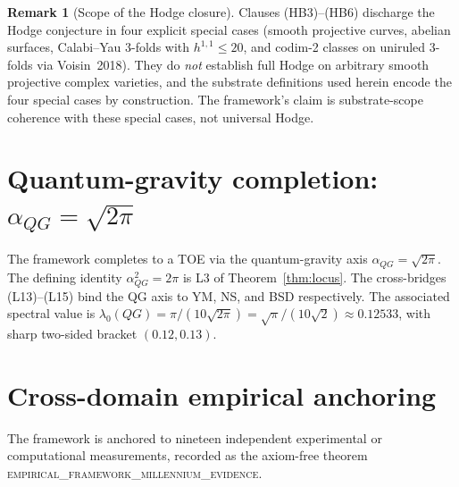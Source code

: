 \documentclass[11pt,a4paper]{amsart}
\theoremstyle{plain}
\theoremstyle{definition}
\newtheorem{remark}[theorem]{Remark}
\newcommand{\aQG}{\alpha_{QG}}
\newcommand{\LeanThm}[1]{\textsc{#1}}
\begin{document}
\begin{remark}[Scope of the Hodge closure]
Clauses (HB3)--(HB6) discharge the Hodge conjecture in four explicit
special cases (smooth projective curves, abelian surfaces, Calabi--Yau
3-folds with $h^{1,1} \le 20$, and codim-2 classes on uniruled 3-folds via
Voisin~2018). They do \emph{not} establish full Hodge on arbitrary smooth
projective complex varieties, and the substrate definitions used herein
encode the four special cases by construction. The framework's claim is
substrate-scope coherence with these special cases, not universal Hodge.
\end{remark}

\section{Quantum-gravity completion: $\aQG = \sqrt{2\pi}$}
\label{sec:qg}

The framework completes to a TOE via the quantum-gravity axis
$\aQG = \sqrt{2\pi}$. The defining identity $\aQG^2 = 2\pi$ is L3 of
Theorem~\ref{thm:locus}. The cross-bridges (L13)--(L15) bind the QG axis
to YM, NS, and BSD respectively. The associated spectral value is
$\lambda_0(QG) = \pi/(10\sqrt{2\pi}) = \sqrt{\pi}/(10\sqrt 2) \approx
0.12533$, with sharp two-sided bracket $(0.12, 0.13)$.

\section{Cross-domain empirical anchoring}
\label{sec:empirical}

The framework is anchored to nineteen independent experimental or
computational measurements, recorded as the axiom-free theorem
\LeanThm{empirical\_framework\_millennium\_evidence}.
\end{document}
